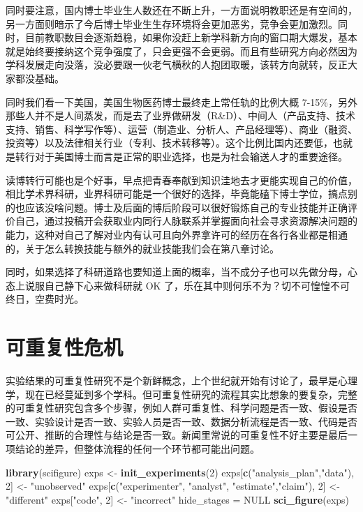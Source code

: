 \documentclass[]{tufte-book}
\newenvironment{Shaded}{}{}
\newcommand{\DecValTok}[1]{\textcolor[rgb]{0.25,0.63,0.44}{#1}}
\newcommand{\KeywordTok}[1]{\textcolor[rgb]{0.00,0.44,0.13}{\textbf{#1}}}
\newcommand{\NormalTok}[1]{#1}
\newcommand{\OtherTok}[1]{\textcolor[rgb]{0.00,0.44,0.13}{#1}}
\newcommand{\StringTok}[1]{\textcolor[rgb]{0.25,0.44,0.63}{#1}}
\begin{document}
同时要注意，国内博士毕业生人数还在不断上升，一方面说明教职还是有空间的，另一方面则暗示了今后博士毕业生生存环境将会更加恶劣，竞争会更加激烈。同时，目前教职数目会逐渐趋稳，如果你没赶上新学科新方向的窗口期大爆发，基本就是始终要接纳这个竞争强度了，只会更强不会更弱。而且有些研究方向必然因为学科发展走向没落，没必要跟一伙老气横秋的人抱团取暖，该转方向就转，反正大家都没基础。

同时我们看一下美国，美国生物医药博士最终走上常任轨的比例大概 7-15\%，另外那些人并不是人间蒸发，而是去了业界做研发（R\&D）、中间人（产品支持、技术支持、销售、科学写作等）、运营（制造业、分析人、产品经理等）、商业（融资、投资等）以及法律相关行业（专利、技术转移等）。这个比例比国内还要低，也就是转行对于美国博士而言是正常的职业选择，也是为社会输送人才的重要途径。

读博转行可能也是个好事，早点把青春奉献到知识洼地去才更能实现自己的价值，相比学术界科研，业界科研可能是一个很好的选择，毕竟能磕下博士学位，搞点别的也应该没啥问题。博士及后面的博后阶段可以很好锻炼自己的专业技能并正确评价自己，通过投稿开会获取业内同行人脉联系并掌握面向社会寻求资源解决问题的能力，这种对自己了解对业内有认可且向外界拿许可的经历在各行各业都是相通的，关于怎么转换技能与额外的就业技能我们会在第八章讨论。

同时，如果选择了科研道路也要知道上面的概率，当不成分子也可以先做分母，心态上说服自己静下心来做科研就 OK 了，乐在其中则何乐不为？切不可惶惶不可终日，空费时光。

\hypertarget{ux53efux91cdux590dux6027ux5371ux673a}{%
\section{可重复性危机}\label{ux53efux91cdux590dux6027ux5371ux673a}}

实验结果的可重复性研究不是个新鲜概念，上个世纪就开始有讨论了，最早是心理学，现在已经蔓延到多个学科。但可重复性研究的流程其实比想象的要复杂，完整的可重复性研究包含多个步骤，例如人群可重复性、科学问题是否一致、假设是否一致、实验设计是否一致、实验人员是否一致、数据分析流程是否一致、代码是否可公开、推断的合理性与结论是否一致。新闻里常说的可重复性不好主要是最后一项结论的差异，但整体流程的任何一个环节都可能出问题。

\begin{Shaded}
\begin{Highlighting}[]
\KeywordTok{library}\NormalTok{(scifigure)}
\NormalTok{exps <-}\StringTok{ }\KeywordTok{init_experiments}\NormalTok{(}\DecValTok{2}\NormalTok{)}
\NormalTok{exps[}\KeywordTok{c}\NormalTok{(}\StringTok{"analysis_plan"}\NormalTok{,}\StringTok{"data"}\NormalTok{), }\DecValTok{2}\NormalTok{] <-}\StringTok{ "unobserved"}
\NormalTok{exps[}\KeywordTok{c}\NormalTok{(}\StringTok{"experimenter"}\NormalTok{, }\StringTok{"analyst"}\NormalTok{, }\StringTok{"estimate"}\NormalTok{,}\StringTok{"claim"}\NormalTok{), }\DecValTok{2}\NormalTok{] <-}\StringTok{ "different"}
\NormalTok{exps[}\StringTok{"code"}\NormalTok{, }\DecValTok{2}\NormalTok{] <-}\StringTok{ "incorrect"}
\NormalTok{hide_stages =}\StringTok{ }\OtherTok{NULL}
\KeywordTok{sci_figure}\NormalTok{(exps)}
\end{Highlighting}
\end{Shaded}
\end{document}
